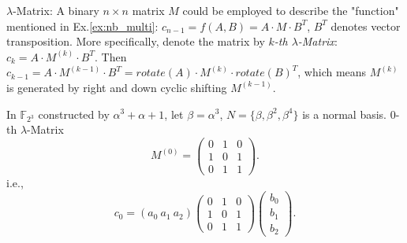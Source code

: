 \documentclass{acm_proc_article-sp}
\begin{document}
\begin{Example}
$\lambda$-Matrix: A binary $n\times n$ matrix $M$ could be employed to describe the "function"
 mentioned in Ex.\ref{ex:nb_multi}: $c_{n-1} = f(A, B) = A \cdot M \cdot B^T$, $B^T$ denotes vector transposition. 
More specifically, denote the matrix by \emph{$k$-th $\lambda$-Matrix}: $c_k = A \cdot M^{(k)} \cdot B^T$.
Then $c_{k-1} = A \cdot M^{(k-1)} \cdot B^T = rotate(A) \cdot M^{(k)} \cdot rotate(B)^T$, which means $M^{(k)}$ is generated
by right and down cyclic shifting $M^{(k-1)}$.

In $\mathbb{F}_{2^3}$ constructed by $\alpha^3 + \alpha + 1$, let $\beta = \alpha^3$, $N = \{ \beta, \beta^2, \beta^4\}$ 
is a normal basis. $0$-th $\lambda$-Matrix
\begin{displaymath}
M^{(0)} = \left(
\begin{array} {lcr}
0 & 1 & 0\\
1 & 0 & 1\\
0 & 1 & 1
\end{array} \right).
\end{displaymath}
i.e.,
\begin{displaymath}
c_0 = (a_0\  a_1\  a_2)\left(
\begin{array} {lcr}
0 & 1 & 0\\
1 & 0 & 1\\
0 & 1 & 1
\end{array} \right)\left(
\begin{array} {lcr}
b_0\\
b_1\\
b_2
\end{array} \right).
\end{displaymath}
\end{Example}
\end{document}
